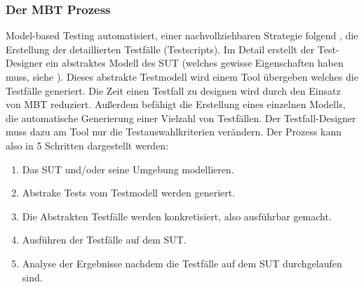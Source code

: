 \subsubsection{Der MBT Prozess}
Model-based Testing automatisiert, einer nachvollziehbaren Strategie folgend , die Erstellung der detaillierten Testfälle (Testscripts).
Im Detail erstellt der Test-Designer ein abstraktes Modell des SUT (welches gewisse Eigenschaften haben muss, siehe ). Dieses abstrakte Testmodell wird einem Tool übergeben welches die Testfälle generiert. Die Zeit einen Testfall zu designen wird durch den Einsatz von MBT reduziert. Außerdem befähigt die Erstellung eines einzelnen Modells, die automatische Generierung einer Vielzahl von Testfällen. Der Testfall-Designer muss dazu am Tool nur die Testauswahlkriterien verändern. \cite{utting_practical_2007} Der Prozess kann also in 5 Schritten dargestellt werden:

\begin{enumerate}
\item Das SUT und/oder seine Umgebung modellieren.
\item Abstrake Tests vom Testmodell werden generiert.
\item Die Abstrakten Testfälle werden konkretisiert, also ausführbar gemacht.
\item Ausführen der Testfälle auf dem SUT.
\item Analyse der Ergebnisse nachdem die Testfälle auf dem SUT durchgelaufen sind.
\end{enumerate}


